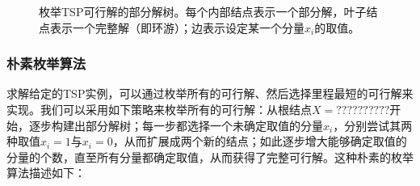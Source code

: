 \begin{figure}[htp]
   \caption{\fangsong 枚举TSP可行解的部分解树。每个内部结点表示一个部分解，叶子结点表示一个完整解（即环游）；边表示设定某一个分量$x_{i}$的取值。}
   \label{TSPPartialSolutionTree}
\end{figure}
 
 \subsubsection*{朴素枚举算法}
    求解给定的TSP实例，可以通过枚举所有的可行解、然后选择里程最短的可行解来实现。我们可以采用如下策略来枚举所有的可行解：从根结点$X=??????????$开始，逐步构建出部分解树；每一步都选择一个未确定取值的分量$x_{i}$，分别尝试其两种取值$x_{i}=1$与$x_{i}=0$，从而扩展成两个新的结点；如此逐步增大能够确定取值的分量的个数，直至所有分量都确定取值，从而获得了完整可行解。这种朴素的枚举算法描述如下：
    
